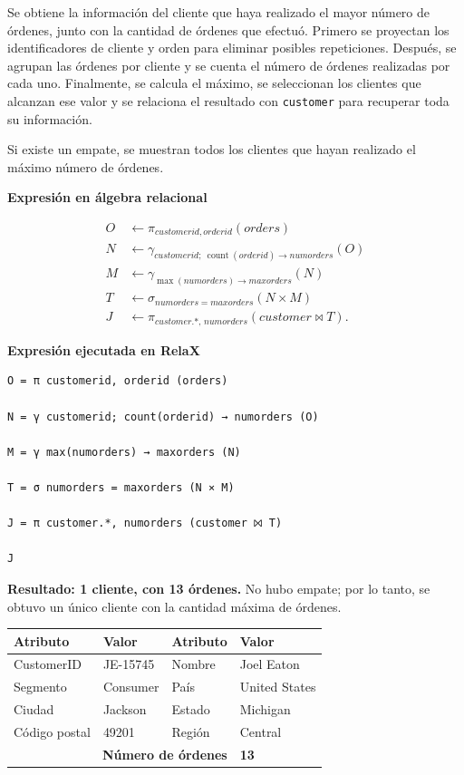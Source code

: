 
Se obtiene la información del cliente que haya realizado el mayor número de órdenes, junto con la cantidad de órdenes que efectuó. Primero se proyectan los identificadores de cliente y orden para eliminar posibles repeticiones. Después, se agrupan las órdenes por cliente y se cuenta el número de órdenes realizadas por cada uno. Finalmente, se calcula el máximo, se seleccionan los clientes que alcanzan ese valor y se relaciona el resultado con \texttt{customer} para recuperar toda su información.

Si existe un empate, se muestran todos los clientes que hayan realizado el máximo número de órdenes.

\textbf{Expresión en álgebra relacional}

\begin{align*}
O &\leftarrow \pi_{customerid,orderid}(orders)\\
N &\leftarrow \gamma_{customerid;\ \operatorname{count}(orderid)\to numorders}(O)\\
M &\leftarrow \gamma_{\operatorname{max}(numorders)\to maxorders}(N)\\
T &\leftarrow \sigma_{numorders=maxorders}(N\times M)\\
J &\leftarrow \pi_{customer.*,\,numorders}(customer\bowtie T).
\end{align*}

\textbf{Expresión ejecutada en RelaX}

\begin{lstlisting}
O = π customerid, orderid (orders)

N = γ customerid; count(orderid) → numorders (O)

M = γ max(numorders) → maxorders (N)

T = σ numorders = maxorders (N ⨯ M)

J = π customer.*, numorders (customer ⨝ T)

J
\end{lstlisting}

\textbf{Resultado: 1 cliente, con 13 órdenes.} No hubo empate; por lo tanto, se obtuvo un único cliente con la cantidad máxima de órdenes.

\begin{center}
\small
\begin{tabular}{llll}
\toprule
\rowcolor{Fondo}
Atributo & Valor & Atributo & Valor\\
\midrule
CustomerID & JE-15745 & Nombre & Joel Eaton\\
Segmento & Consumer & País & United States\\
Ciudad & Jackson & Estado & Michigan\\
Código postal & 49201 & Región & Central\\
\multicolumn{3}{r}{\textbf{Número de órdenes}} & \textbf{13}\\
\bottomrule
\end{tabular}
\end{center}


